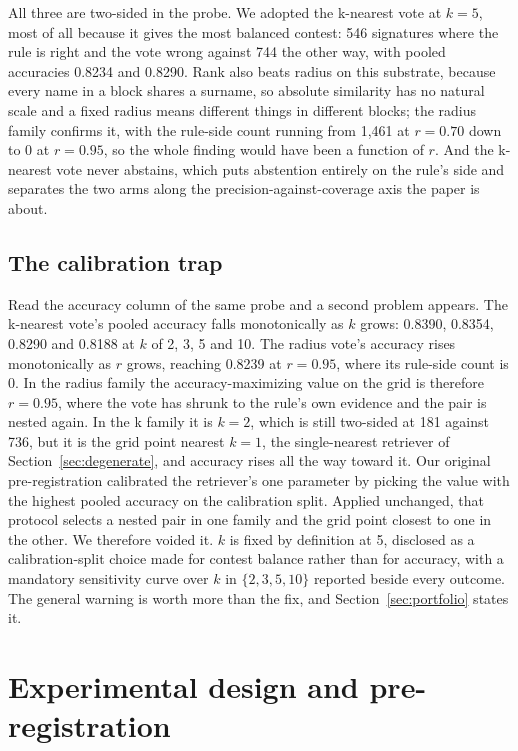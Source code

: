 \documentclass[11pt]{article}
\begin{document}
All three are two-sided in the probe. We adopted the k-nearest vote at
$k = 5$, most of all because it gives the most balanced contest: 546
signatures where the rule is right and the vote wrong against 744 the other
way, with pooled accuracies 0.8234 and 0.8290. Rank also beats radius on this
substrate, because every name in a block shares a surname, so absolute
similarity has no natural scale and a fixed radius means different things in
different blocks; the radius family confirms it, with the rule-side count
running from 1{,}461 at $r = 0.70$ down to 0 at $r = 0.95$, so the whole
finding would have been a function of $r$. And the k-nearest vote never
abstains, which puts abstention entirely on the rule's side and separates the
two arms along the precision-against-coverage axis the paper is about.

\subsection{The calibration trap}
\label{sec:calibration-trap}

Read the accuracy column of the same probe and a second problem appears. The
k-nearest vote's pooled accuracy falls monotonically as $k$ grows: 0.8390,
0.8354, 0.8290 and 0.8188 at $k$ of 2, 3, 5 and 10. The radius vote's accuracy
rises monotonically as $r$ grows, reaching 0.8239 at $r = 0.95$, where its
rule-side count is 0. In the radius family the accuracy-maximizing value on the grid is therefore $r = 0.95$, where the vote has shrunk to the rule's own evidence and the pair is nested again. In the k family it is
$k = 2$, which is still two-sided at 181 against 736, but it is the grid point
nearest $k = 1$, the single-nearest retriever of
Section~\ref{sec:degenerate}, and accuracy rises all the way toward it. Our
original pre-registration calibrated the retriever's one parameter by picking
the value with the highest pooled accuracy on the calibration split. Applied
unchanged, that protocol selects a nested pair in one family and the grid
point closest to one in the other. We therefore
voided it. $k$ is fixed by definition at 5, disclosed as a calibration-split
choice made for contest balance rather than for accuracy, with a mandatory
sensitivity curve over $k$ in $\{2, 3, 5, 10\}$ reported beside every outcome.
The general warning is worth more than the fix, and
Section~\ref{sec:portfolio} states it.

\section{Experimental design and pre-registration}
\label{sec:design}
\end{document}
